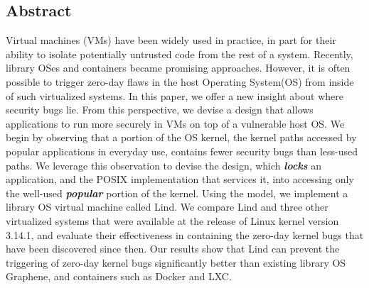 \subsection*{Abstract}

Virtual machines (VMs) have been widely used in practice, in part for their ability to
isolate potentially untrusted code from the rest of a system.
Recently, library OSes and containers became promising approaches.
%
However, it is often possible to trigger zero-day flaws
in the host Operating System(OS) from inside of such virtualized systems.
%
In this paper, we offer a new insight about where security bugs lie. From this perspective, we devise a design that allows applications to run more securely in VMs on top of a vulnerable host OS. 
We begin by observing that a portion of the OS kernel, the kernel paths accessed
by popular applications in everyday use, contains fewer security bugs than less-used paths. We
leverage this observation to devise the \lip design, which
\textbf{\textit{locks}} an application, and the POSIX implementation that services it, into
accessing only the well-used \textbf{\textit{popular}} portion of the kernel.  Using the \lip model, we
implement a library OS virtual machine called Lind.
%
We compare Lind and three other virtualized systems that were
available at the release of Linux kernel version 3.14.1, and evaluate
their effectiveness in containing the zero-day kernel bugs that have been discovered
since then.
%
Our results show that Lind can prevent the triggering of zero-day kernel bugs significantly better
than existing library OS Graphene, and containers such as Docker and LXC.
